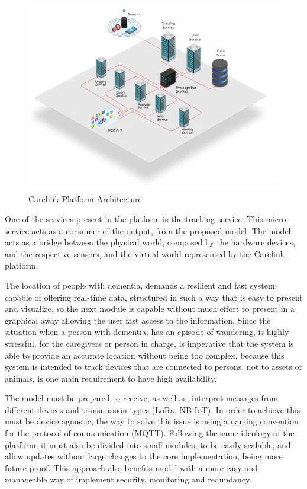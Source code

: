 \begin{figure}[htbp]
  \centering
  
    {\includegraphics[width=1\linewidth]{Chapters/Figures/Carelink-Diagrams-1024x724.png}}%
 
  \caption{Carelink Platform Architecture~\cite{carelink}}
  \label{fig:Platform_Archictecture}
\end{figure}
One of the services present in the platform is the tracking service. This micro-service acts as a consumer of the output, from the proposed model. 
The model acts as a bridge between the physical world, composed by the hardware devices, and the respective sensors, and the virtual world represented by the Carelink platform.

The location of people with dementia, demands a resilient and fast system, capable of offering real-time data, structured in such a way that is easy to present and visualize, so the next module is capable without much effort to present in a graphical away allowing the user fast access to the information.
Since the situation when a person with dementia, has an episode of wandering, is highly stressful, for the caregivers or person in charge, is imperative that the system is able to provide an accurate location without being too complex, because this system is intended to track devices that are connected to persons, not to assets or animals, is one main requirement to have high availability.\newline


The model must be prepared to receive, as well as, interpret messages from different devices and transmission types (LoRa, NB-IoT). In order to achieve this must be device agnostic, the way to solve this issue is using a naming convention for the protocol of communication (MQTT). 
Following the same ideology of the platform, it must also be divided into small modules, to be easily scalable, and allow updates without large changes to the core implementation, being more future proof. This approach also benefits model with a more easy and manageable way of implement security, monitoring and redundancy.

